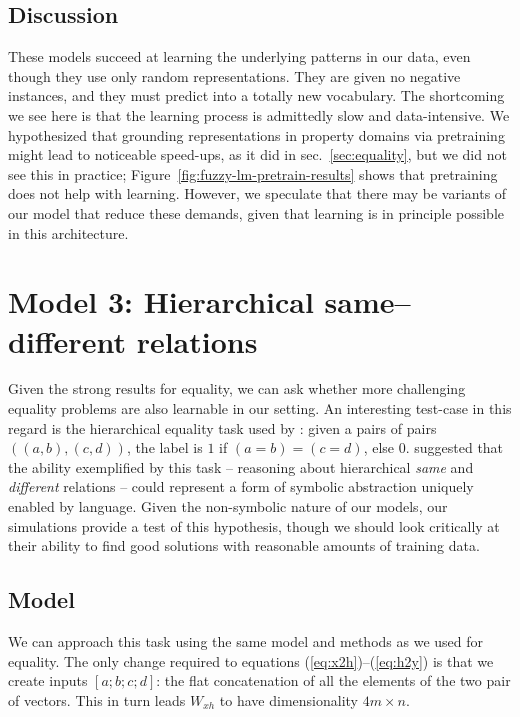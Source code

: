 \documentclass{article}
\newcommand{\secref}[1]{sec.~\ref{#1}}
\newcommand{\figref}[1]{Figure~\ref{#1}}
\newcommand{\eg}[1]{(\ref{#1})}
\newcommand{\dasheg}[2]{\eg{#1}--\eg{#2}}
\newcommand{\update}[1]{{\color{darkblue}#1}}
\begin{document}
\subsection{Discussion}

These models succeed at learning the underlying patterns in our data, even though they use only random representations.  They are given no negative instances, and they must predict into a totally new vocabulary. \update{The shortcoming we see here is that the learning process is admittedly slow and data-intensive. We hypothesized that grounding representations in property domains via pretraining might lead to noticeable speed-ups, as it did in \secref{sec:equality}, but we did not see this in practice;  \figref{fig:fuzzy-lm-pretrain-results} shows that pretraining does not help with learning.} However, we speculate that there may be variants of our model that reduce these demands, given that learning is in principle possible in this architecture.


\section{Model 3: Hierarchical same--different relations}\label{sec:premack}

Given the strong results for equality, we can ask whether more challenging equality problems are also learnable in our setting. An interesting test-case in this regard is the hierarchical equality task used by \citet{Premack:1983}: given a pairs of pairs $((a,b), (c,d))$, the label is $1$ if $(a = b) = (c = d)$, else $0$.  \citet{Premack:1983} suggested that the ability exemplified by this task -- reasoning about hierarchical \emph{same} and \emph{different} relations -- could represent a form of symbolic abstraction uniquely enabled by language.  Given the non-symbolic nature of our models, our simulations provide a test of this hypothesis, though we should look critically at their ability to find good solutions with reasonable amounts of training data.


\subsection{Model}

We can approach this task using the same model and methods as we used for equality. The only change required to equations \dasheg{eq:x2h}{eq:h2y} is that we create inputs $[a;b;c;d]$: the flat concatenation of all the elements of the two pair of vectors. This in turn leads $W_{xh}$ to have dimensionality $4m \times n$.
\end{document}
